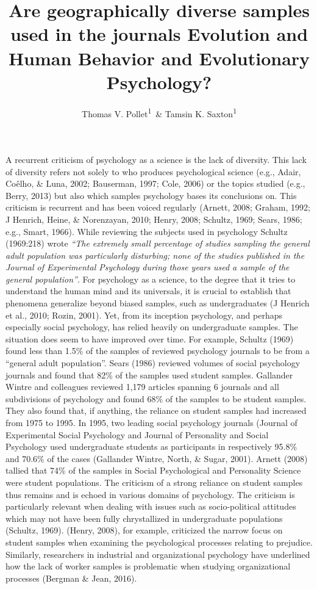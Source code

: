 \documentclass[english,man]{apa6}
\title{Are geographically diverse samples used in the journals Evolution and
Human Behavior and Evolutionary Psychology?}
\author{Thomas V. Pollet\textsuperscript{1}~\& Tamsin K. Saxton\textsuperscript{1}}
\affiliation{
    \vspace{0.5cm}
          \textsuperscript{1} Northumbria University  }
\theoremstyle{definition}
\theoremstyle{definition}
\theoremstyle{remark}
\begin{document}
\maketitle

\setcounter{secnumdepth}{0}



A recurrent criticism of psychology as a science is the lack of
diversity. This lack of diversity refers not solely to who produces
psychological science (e.g., Adair, Coêlho, \& Luna, 2002; Bauserman,
1997; Cole, 2006) or the topics studied (e.g., Berry, 2013) but also
which samples psychology bases its conclusions on. This criticism is
recurrent and has been voiced regularly (Arnett, 2008; Graham, 1992; J
Henrich, Heine, \& Norenzayan, 2010; Henry, 2008; Schultz, 1969; Sears,
1986; e.g., Smart, 1966). While reviewing the subjects used in
psychology Schultz (1969:218) wrote \emph{\enquote{The extremely small
percentage of studies sampling the general adult population was
particularly disturbing; none of the studies published in the Journal of
Experimental Psychology during those years used a sample of the general
population}}. For psychology as a science, to the degree that it tries
to understand the human mind and its universals, it is crucial to
establish that phenomena generalize beyond biased samples, such as
undergraduates (J Henrich et al., 2010; Rozin, 2001). Yet, from its
inception psychology, and perhaps especially social psychology, has
relied heavily on undergraduate samples. The situation does seem to have
improved over time. For example, Schultz (1969) found less than 1.5\% of
the samples of reviewed psychology journals to be from a
\enquote{general adult population}. Sears (1986) reviewed volumes of
social psychology journals and found that 82\% of the samples used
student samples. Gallander Wintre and colleagues reviewed 1,179 articles
spanning 6 journals and all subdivisions of psychology and found 68\% of
the samples to be student samples. They also found that, if anything,
the reliance on student samples had increased from 1975 to 1995. In
1995, two leading social psychology journals (Journal of Experimental
Social Psychology and Journal of Personality and Social Psychology used
undergraduate students as participants in respectively 95.8\% and 70.6\%
of the cases (Gallander Wintre, North, \& Sugar, 2001). Arnett (2008)
tallied that 74\% of the samples in Social Psychological and Personality
Science were student populations. The criticism of a strong reliance on
student samples thus remains and is echoed in various domains of
psychology. The criticism is particularly relevant when dealing with
issues such as socio-political attitudes which may not have been fully
chrystallized in undergraduate populations (Schultz, 1969). (Henry,
2008), for example, criticized the narrow focus on student samples when
examining the psychological processes relating to prejudice. Similarly,
researchers in industrial and organizational psychology have underlined
how the lack of worker samples is problematic when studying
organizational processes (Bergman \& Jean, 2016).
\end{document}
